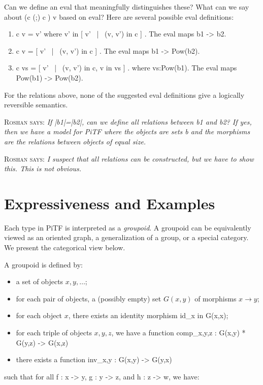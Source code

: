 \documentclass{llncs}
\newcommand{\roshan}[1]{\textsc{Roshan says:} 
  \textit{#1}
}
\begin{document}
Can we define an {{eval}} that meaningfully distinguishes these? What
can we say about {{(c (;) c^^^) v}} based on {{eval}}?  Here are
several possible {{eval}} definitions:

\begin{enumerate}
\item {{ c v = v'}} where {{ v' in {[ v' ~|~ (v, v') in c ]} }}. The
  eval maps {{b1 -> b2}}. 

\item {{ c v = {[ v' ~|~ (v, v') in c ]} }}. The eval maps {{b1 -> Pow(b2)}}.

\item {{ c vs = {[ v' ~|~ (v, v') in c, v in vs ]} }}. where
  {{vs:Pow(b1)}}. The eval maps {{Pow(b1) -> Pow(b2)}}. 

\end{enumerate}

For the relations above, none of the suggested eval definitions give a
logically reversible semantics.

\roshan{If {{|b1|=|b2|}}, can we define all relations between {{b1}} and
{{b2}}? If yes, then we have a model for {{PiTF}} where the objects
are sets {{b}} and the morphisms are the relations between objects of
equal size.}

\roshan{ I suspect that all relations can be constructed, but we have
  to show this. This is not obvious.}

\section{Expressiveness and Examples} 

Each type in {{PiTF}} is interpreted as a \emph{groupoid}. A groupoid can be
equivalently viewed as an oriented graph, a generalization of a group, or a
special category. We present the categorical view below.

A groupoid is defined by:
\begin{itemize}
\item a set of objects $x,y,\ldots$;
\item for each pair of objects, a (possibly empty) set $G(x,y)$ of morphisms
  $x \rightarrow y$; 
\item for each object $x$, there exists an identity morphism {{id_x in G(x,x)}};
\item for each triple of objects $x,y,z$, we have a function 
{{comp_{x,y,z} : G(x,y) * G(y,z) -> G(x,z)}}
\item there exists a function {{inv_{x,y} : G(x,y) -> G(y,x)}}
\end{itemize}
such that for all {{f : x -> y}}, {{g : y -> z}}, and {{h : z -> w}}, we have:
\end{document}
